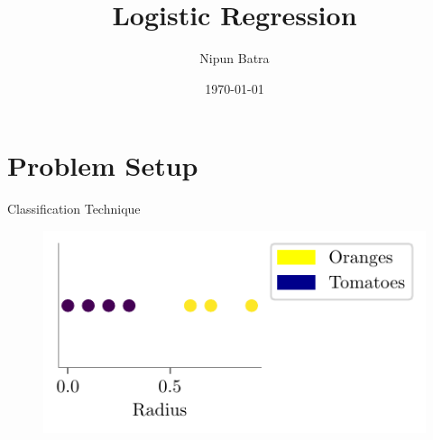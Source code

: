 \documentclass{beamer}
\title{Logistic Regression}
\date{\today}
\author{Nipun Batra}
\institute{IIT Gandhinagar}
\begin{document}
	\maketitle

	\section{Problem Setup}
	
	\begin{frame}{Classification Technique}
	\begin{minipage}{0.3\textwidth}
		
		\begin{figure}
			
			\includegraphics{../assets/logistic-regression/figures/logistic-orange-tomatoes-original.pdf}
		\end{figure}
	\end{minipage} \\

	
\end{frame}
	
\end{document}

